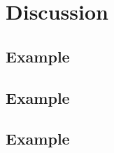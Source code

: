 
\chapter{Discussion} %

\label{Chapter7} %



\section{Example}




\section{Example}





\section{Example}


